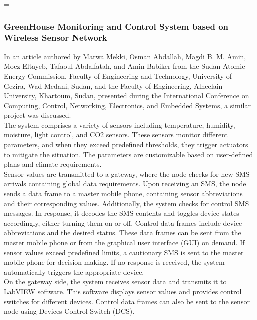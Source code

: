 =\documentclass[12pt, a4paper]{article}
\begin{document}
\subsubsection{GreenHouse Monitoring and Control System based on Wireless Sensor Network}
In an article authored by Marwa Mekki, Osman Abdallah, Magdi B. M. Amin, Moez Eltayeb, Tafaoul Abdalfatah, and Amin Babiker \cite{7381396} from the Sudan Atomic Energy Commission, Faculty of Engineering and Technology, University of Gezira, Wad Medani, Sudan, and the Faculty of Engineering, Alneelain University, Khartoum, Sudan, presented during the International Conference on Computing, Control, Networking, Electronics, and Embedded Systems, a similar project was discussed.\\
The system comprises a variety of sensors including temperature, humidity, moisture, light control, and CO2 sensors. These sensors monitor different parameters, and when they exceed predefined thresholds, they trigger actuators to mitigate the situation. The parameters are customizable based on user-defined plans and climate requirements.\\
Sensor values are transmitted to a gateway, where the node checks for new SMS arrivals containing global data requirements. Upon receiving an SMS, the node sends a data frame to a master mobile phone, containing sensor abbreviations and their corresponding values. Additionally, the system checks for control SMS messages. In response, it decodes the SMS contents and toggles device states accordingly, either turning them on or off. Control data frames include device abbreviations and the desired status. These data frames can be sent from the master mobile phone or from the graphical user interface (GUI) on demand. If sensor values exceed predefined limits, a cautionary SMS is sent to the master mobile phone for decision-making. If no response is received, the system automatically triggers the appropriate device.\\
On the gateway side, the system receives sensor data and transmits it to LabVIEW software. This software displays sensor values and provides control switches for different devices. Control data frames can also be sent to the sensor node using Devices Control Switch (DCS).
 
\end{document}
